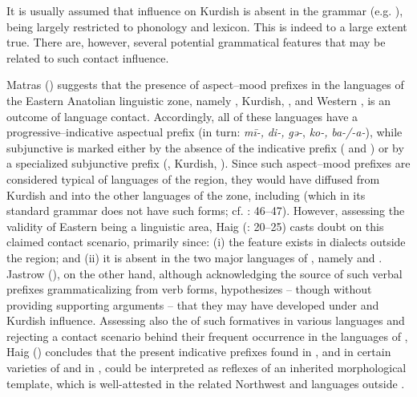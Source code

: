 \documentclass[output=paper]{langsci/langscibook}
\begin{document}
It is usually assumed that  influence on Kurdish is absent in the grammar (e.g. \citealt{Edwards1851}), being largely restricted to phonology and lexicon. This is indeed to a large extent true. There are, however, several potential grammatical features that may be related to such contact influence. 

Matras (\citeyear[75]{Matras2010}) suggests that the presence of aspect--mood prefixes in the languages of the Eastern Anatolian linguistic zone, namely , Kurdish, ,  and Western , is an outcome of language contact. Accordingly, all of these languages have a progressive–indicative aspectual prefix (in turn: \textit{mī-,} \textit{di-,} \textit{gǝ-}, \textit{ko-,} \textit{ba-/-a-}), while subjunctive is marked either by the absence of the indicative prefix ( and ) or by a specialized subjunctive prefix (, Kurdish, ). Since such aspect--mood prefixes are considered typical of  languages of the region, they would have diffused from Kurdish and  into the other languages of the zone, including  (which in its standard grammar does not have such forms; cf. \citealt{Ryding2014}: 46–47). However, assessing the validity of Eastern  being a linguistic area, Haig (\citeyear{HaigÖpengin2014}: 20–25) casts doubt on this claimed contact scenario, primarily since: (i) the feature exists in  dialects outside the region; and (ii) it is absent in the two major languages of , namely  and . Jastrow (\citeyear[92]{Jastrow2011Kurdish}), on the other hand, although acknowledging the source of such verbal prefixes grammaticalizing from   verb forms, hypothesizes – though without providing supporting arguments – that they may have developed under  and Kurdish influence. Assessing also the  of such formatives in various languages and rejecting a contact scenario behind their frequent occurrence in the languages of , Haig (\citeyear[26]{Haig2014}) concludes that the present indicative prefixes found in , and in certain varieties of  and  in , could be interpreted as reflexes of an inherited morphological template, which is well-attested in the related Northwest  and  languages outside .
\end{document}
